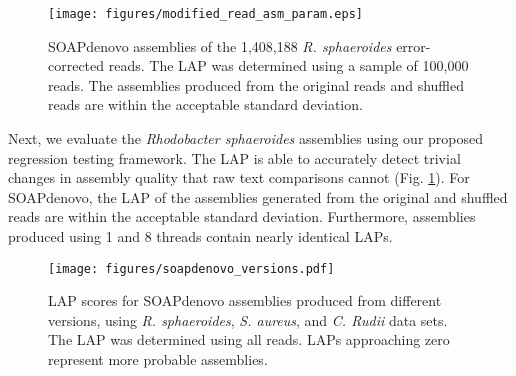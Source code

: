 

\begin{figure}[!htb]%
\begin{center}
  \texttt{[image: figures/modified\_read\_asm\_param.eps]}
\end{center}
\renewcommand{\baselinestretch}{1}
\small\normalsize
\begin{quote}
\caption[LAP scores for original and shuffled \emph{R. sphaeroides} data set.]{SOAPdenovo assemblies of the 1,408,188 \emph{R. sphaeroides} error-corrected reads.  The LAP was determined using a sample of 100,000 reads.  The assemblies produced from the original reads and shuffled reads are within the acceptable standard deviation.}
\label{fig:modified_read_asm_param}
\end{quote}
\end{figure}
\renewcommand{\baselinestretch}{2}
\small\normalsize

Next, we evaluate the \emph{Rhodobacter sphaeroides} assemblies using our proposed regression testing framework.
The LAP is able to accurately detect trivial changes in assembly quality that raw text comparisons cannot (Fig. \ref{fig:modified_read_asm_param}).
For SOAPdenovo, the LAP of the assemblies generated from the original and shuffled reads are within the acceptable standard deviation.  Furthermore, assemblies produced using 1 and 8 threads contain nearly identical LAPs.

\begin{figure}[!htb]%
\begin{center}
  \texttt{[image: figures/soapdenovo\_versions.pdf]}
\end{center}
\renewcommand{\baselinestretch}{1}
\small\normalsize
\begin{quote}
  \caption[LAP scores for SOAPdenovo assemblies across various versions]{LAP scores for SOAPdenovo assemblies produced from different versions, using \emph{R. sphaeroides}, \emph{S. aureus}, and \emph{C. Rudii} data sets.
  The LAP was determined using all reads.  LAPs approaching zero represent more probable assemblies.
  }
  \label{fig:soapdenovo_versions}
\end{quote}
\end{figure}
\renewcommand{\baselinestretch}{2}
\small\normalsize


